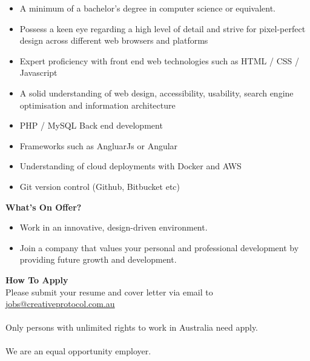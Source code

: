 \documentclass[11pt, oneside, a4paper, titlepage]{article}
\begin{document}
\begin{itemize}
    	\item A minimum of a bachelor's degree in computer science or equivalent. 
    	\item Possess a keen eye regarding a high level of detail and strive for pixel-perfect design across different web browsers and platforms 
    	\item Expert proficiency with front end web technologies such as HTML / CSS / Javascript 
    	\item A solid understanding of web design, accessibility, usability, search engine optimisation and information architecture 
    	\item PHP / MySQL Back end development 
    	\item Frameworks such as AngluarJs or Angular 
    	\item Understanding of cloud deployments with Docker and AWS 
    	\item Git version control (Github, Bitbucket etc) 
\end{itemize}
\hfill \break
\textbf{What's On Offer?}
\begin{itemize}
    	\item Work in an innovative, design-driven environment. 
    	\item Join a company that values your personal and professional development by providing future growth and development. 
\end{itemize}
\hfill \break
\textbf{How To Apply}
\\
Please submit your resume and cover letter via email to \href{mailto:jobs@creativeprotocol.com.au}{jobs@creativeprotocol.com.au}
\\
\\
Only persons with unlimited rights to work in Australia need apply. 
\\
\\
We are an equal opportunity employer. 
\newpage
\end{document}
